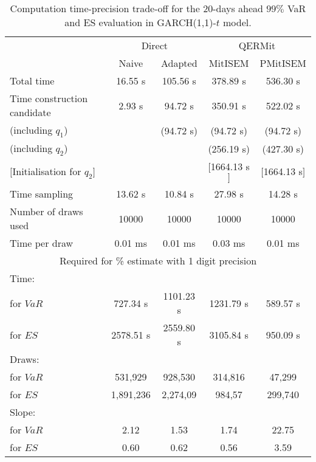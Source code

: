 { \renewcommand{\arraystretch}{1.3} 
\begin{table}[h] 
\centering 
\caption{Computation time-precision trade-off for the 20-days ahead  $99\%$ VaR and ES evaluation in GARCH(1,1)-$t$ model.} 
\label{tab:time_precision_t_garch2_noS} 
\begin{tabular}{lcccc}  
  & \multicolumn{2}{c}{Direct} & \multicolumn{2}{c}{QERMit}  \\ \cline{2-5} 
  & Naive & Adapted & MitISEM & PMitISEM  \\ \hline 
Total time & 16.55 s & 105.56 s & 378.89 s & 536.30 s \\ 
Time construction candidate & 2.93 s & 94.72 s & 350.91 s & 522.02 s \\ 
 (including $q_{1}$) &   &  (94.72 s) & (94.72 s) & (94.72 s) \\ 
 (including $q_{2}$) &   &  & (256.19 s) & (427.30 s) \\ 
$[$Initialisation for $q_{2}$$]$&   &   & $[$1664.13 s$]$ & $[$1664.13 s$]$ \\ 
Time sampling & 13.62 s & 10.84 s & 27.98 s & 14.28 s  \\  
Number of draws used & 10000 & 10000 & 10000 & 10000 \\ 
Time per draw & 0.01 ms & 0.01 ms & 0.03 ms & 0.01 ms \\ \hline 
\multicolumn{5}{c}{Required for \% estimate with 1 digit precision} \\ \hline 
Time: &  &  &   &  \\ 
\hspace{1cm} for $VaR$ & 727.34 s & 1101.23 s & 1231.79 s & 589.57 s \\ 
\hspace{1cm} for $ES$ & 2578.51 s & 2559.80 s & 3105.84 s & 950.09 s \\ 
Draws: &  &  &   &  \\ 
\hspace{1cm} for $VaR$ & 531,929 & 928,530  & 314,816  & 47,299  \\ 
\hspace{1cm} for $ES$ & 1,891,236 & 2,274,09  & 984,57   & 299,740  \\ 
\hline 
Slope: &  &  &   &  \\ 
\hspace{1cm} for $VaR$ & 2.12 & 1.53  & 1.74  & 22.75  \\ 
\hspace{1cm} for $ES$ & 0.60 & 0.62  & 0.56   & 3.59  \\  \hline 
\end{tabular} 
\end{table} 
} 
